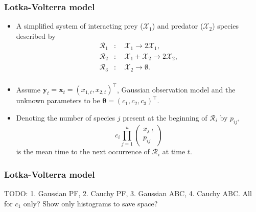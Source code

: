 \documentclass{beamer}
\newcommand{\bx}{\bm{x}}
\newcommand{\by}{\bm{y}}
\newcommand{\btheta}{\bm{\theta}}
\begin{document}
    \begin{frame}
    \frametitle{Lotka-Volterra model}
    \begin{itemize}
        \item A simplified system of interacting prey ($\mathcal{X}_1$) and predator ($\mathcal{X}_2$) species described by
        \begin{equation*}
        \begin{split}
        \mathcal{R}_1 &: \quad \mathcal{X}_1 \to 2 \mathcal{X}_1, \\
        \mathcal{R}_2 &: \quad \mathcal{X}_1 + \mathcal{X}_2 \to 2 \mathcal{X}_2, \\
        \mathcal{R}_3 &: \quad \mathcal{X}_2 \to \emptyset. \\
        \end{split}
        \end{equation*}
        \item Assume $\by_t = \bx_t = \left(x_{1,t}, x_{2,t}\right)^\intercal$, Gaussian observation model and the unknown parameters to be $\btheta = \left(c_1, c_2, c_3\right)^\intercal$.
        \item Denoting the number of species $j$ present at the beginning of $\mathcal{R}_i$ by $p_{ij}$,
        \begin{equation*}
            c_i \prod_{j=1}^{u} \begin{pmatrix}
            x_{j,t} \\
            p_{ij}
            \end{pmatrix}
        \end{equation*} is the mean time to the next occurrence of $\mathcal{R}_i$ at time $t$.
    \end{itemize}
    \end{frame}

    \begin{frame}
    \frametitle{Lotka-Volterra model}
    
    {\color{red} TODO: 1. Gaussian PF, 2. Cauchy PF, 3. Gaussian ABC, 4. Cauchy ABC. All for $c_1$ only? Show only histograms to save space?}
    \end{frame}
\end{document}
